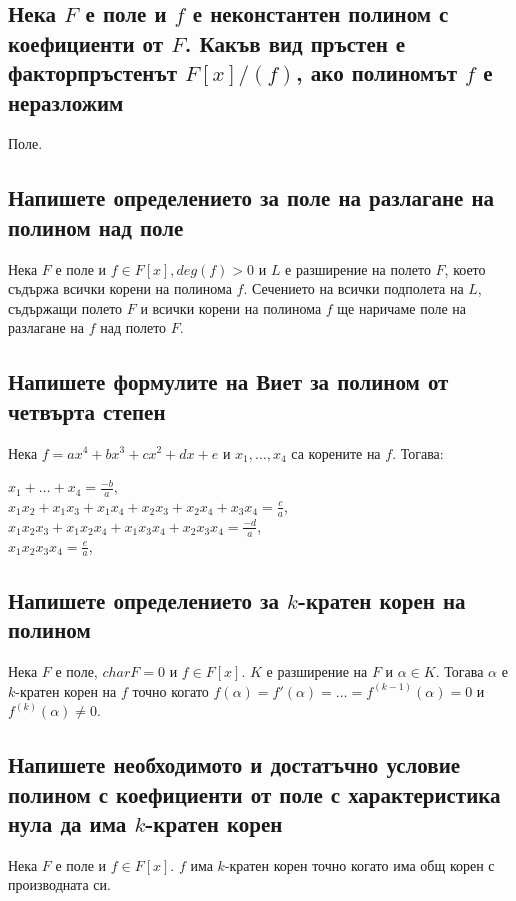 \documentclass[10pt]{article}
\begin{document}
\subsection*{Нека $F$ е поле и $f$ е неконстантен полином с коефициенти от $F$. Какъв вид пръстен е факторпръстенът $F[x]/(f)$, ако полиномът $f$ е неразложим}
Поле.

\subsection*{Напишете определението за поле на разлагане на полином над поле}
Нека $F$ е поле и $f \in F[x], deg(f) > 0$ и $L$ е разширение на полето $F$, което съдържа всички корени на полинома $f$. Сечението на всички подполета на $L$, съдържащи полето $F$ и всички корени на полинома $f$ ще наричаме поле на разлагане на $f$ над полето $F$.

\subsection*{Напишете формулите на Виет за полином от четвърта степен}
Нека $f = ax^4 + bx^3 + cx^2 + dx + e$ и $x_1,\ldots,x_4$ са корените на $f$. Тогава:
\begin{center}
	$x_1 + \ldots + x_4 = \frac{-b}{a}$,\\
	$x_1x_2 + x_1x_3 + x_1x_4 + x_2x_3 + x_2x_4 + x_3x_4 = \frac{c}{a}$,\\
	$x_1x_2x_3 + x_1x_2x_4 + x_1x_3x_4 + x_2x_3x_4 = \frac{-d}{a}$,\\
	$x_1x_2x_3x_4 = \frac{e}{a}$,\\
\end{center}

\subsection*{Напишете определението за $k$-кратен корен на полином}
Нека $F$ е поле, $charF = 0$ и $f \in F[x]$. $K$ е разширение на $F$ и $\alpha \in K$. Тогава $\alpha$ е $k$-кратен корен на $f$ точно когато $f(\alpha) = f'(\alpha) = \ldots = f^{(k-1)}(\alpha) = 0$ и $f^{(k)}(\alpha) \neq 0$.

\subsection*{Напишете необходимото и достатъчно условие полином с коефициенти от поле с характеристика нула да има $k$-кратен корен}
Нека $F$ е поле и $f \in F[x]$. $f$ има $k$-кратен корен точно когато има общ корен с производната си.
\end{document}
